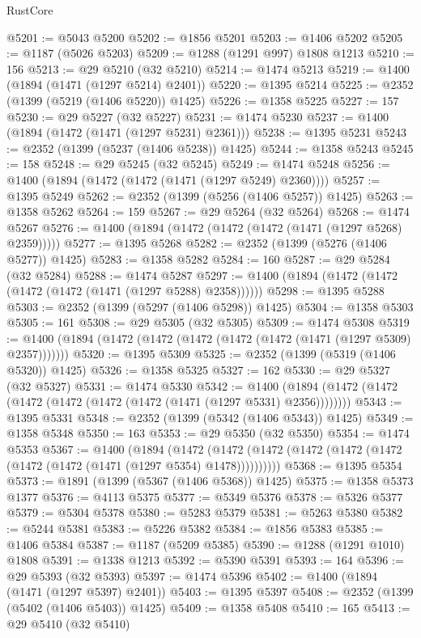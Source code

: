 \begin{lexlean}{RustCore}
\begin{coremodule}
@5201 := @5043 @5200
@5202 := @1856 @5201
@5203 := @1406 @5202
@5205 := @1187 (@5026 @5203)
@5209 := @1288 (@1291 @997) @1808 @1213
@5210 := 156
@5213 := @29 @5210 (@32 @5210)
@5214 := @1474 @5213
@5219 := @1400 (@1894 (@1471 (@1297 @5214) @2401))
@5220 := @1395 @5214
@5225 := @2352 (@1399 (@5219 (@1406 @5220)) @1425)
@5226 := @1358 @5225
@5227 := 157
@5230 := @29 @5227 (@32 @5227)
@5231 := @1474 @5230
@5237 := @1400 (@1894 (@1472 (@1471 (@1297 @5231) @2361)))
@5238 := @1395 @5231
@5243 := @2352 (@1399 (@5237 (@1406 @5238)) @1425)
@5244 := @1358 @5243
@5245 := 158
@5248 := @29 @5245 (@32 @5245)
@5249 := @1474 @5248
@5256 := @1400 (@1894 (@1472 (@1472 (@1471 (@1297 @5249) @2360))))
@5257 := @1395 @5249
@5262 := @2352 (@1399 (@5256 (@1406 @5257)) @1425)
@5263 := @1358 @5262
@5264 := 159
@5267 := @29 @5264 (@32 @5264)
@5268 := @1474 @5267
@5276 := @1400 (@1894 (@1472 (@1472 (@1472 (@1471 (@1297 @5268) @2359)))))
@5277 := @1395 @5268
@5282 := @2352 (@1399 (@5276 (@1406 @5277)) @1425)
@5283 := @1358 @5282
@5284 := 160
@5287 := @29 @5284 (@32 @5284)
@5288 := @1474 @5287
@5297 := @1400 (@1894 (@1472 (@1472 (@1472 (@1472 (@1471 (@1297 @5288) @2358))))))
@5298 := @1395 @5288
@5303 := @2352 (@1399 (@5297 (@1406 @5298)) @1425)
@5304 := @1358 @5303
@5305 := 161
@5308 := @29 @5305 (@32 @5305)
@5309 := @1474 @5308
@5319 := @1400 (@1894 (@1472 (@1472 (@1472 (@1472 (@1472 (@1471 (@1297 @5309) @2357)))))))
@5320 := @1395 @5309
@5325 := @2352 (@1399 (@5319 (@1406 @5320)) @1425)
@5326 := @1358 @5325
@5327 := 162
@5330 := @29 @5327 (@32 @5327)
@5331 := @1474 @5330
@5342 := @1400 (@1894 (@1472 (@1472 (@1472 (@1472 (@1472 (@1472 (@1471 (@1297 @5331) @2356))))))))
@5343 := @1395 @5331
@5348 := @2352 (@1399 (@5342 (@1406 @5343)) @1425)
@5349 := @1358 @5348
@5350 := 163
@5353 := @29 @5350 (@32 @5350)
@5354 := @1474 @5353
@5367 := @1400
    (@1894
      (@1472 (@1472 (@1472 (@1472 (@1472 (@1472 (@1472 (@1472 (@1471 (@1297 @5354) @1478))))))))))
@5368 := @1395 @5354
@5373 := @1891 (@1399 (@5367 (@1406 @5368)) @1425)
@5375 := @1358 @5373 @1377
@5376 := @4113 @5375
@5377 := @5349 @5376
@5378 := @5326 @5377
@5379 := @5304 @5378
@5380 := @5283 @5379
@5381 := @5263 @5380
@5382 := @5244 @5381
@5383 := @5226 @5382
@5384 := @1856 @5383
@5385 := @1406 @5384
@5387 := @1187 (@5209 @5385)
@5390 := @1288 (@1291 @1010) @1808
@5391 := @1338 @1213
@5392 := @5390 @5391
@5393 := 164
@5396 := @29 @5393 (@32 @5393)
@5397 := @1474 @5396
@5402 := @1400 (@1894 (@1471 (@1297 @5397) @2401))
@5403 := @1395 @5397
@5408 := @2352 (@1399 (@5402 (@1406 @5403)) @1425)
@5409 := @1358 @5408
@5410 := 165
@5413 := @29 @5410 (@32 @5410)

\end{coremodule}
\end{lexlean}
